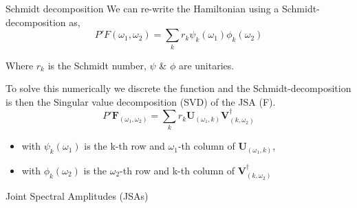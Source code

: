\documentclass{beamer}
\begin{document}
\begin{frame}{Schmidt decomposition}
    We can re-write the Hamiltonian using a Schmidt-decomposition \cite{lvovsky2007decomposing}as,
    \begin{equation}
    P' F(\omega_1,\omega_2) = \sum_k r_k \psi_k(\omega_1) \phi_k(\omega_2)
    \end{equation}

    Where $r_k$ is the Schmidt number, $ \psi $ \& $\phi $ are unitaries.\newline

    To solve this numerically we discrete the function and the Schmidt-decomposition is then the Singular value decomposition (SVD) of the JSA (F).
    \begin{equation}
        P' \textbf{F}_{(\omega_1, \omega_2)} = \sum_k r_k \textbf{U}_{(\omega_1, k)} \textbf{V}_{(k, \omega_2)}^\dagger
    \end{equation}
    \begin{itemize}
        \item with $ \psi_k(\omega_1) $ is the k-th row and $\omega_1$-th column of $\textbf{U}_{(\omega_1, k)}$,
        \item with $ \phi_k(\omega_2) $ is the $\omega_2$-th row and k-th column of $\textbf{V}^\dagger_{(k,\omega_2)}$
    \end{itemize}
\end{frame}

\begin{frame}{Joint Spectral Amplitudes (JSAs)} 
    \centering
        \begin{figure}
        \end{figure}
    \end{frame}
\end{document}
